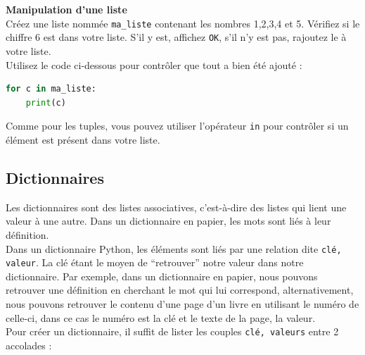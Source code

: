     \begin{Exercice}[5 minutes] \textbf{Manipulation d'une liste}\\
       Créez une liste nommée \lstinline{ma_liste} contenant les nombres 1,2,3,4 et 5. Vérifiez si le chiffre 6 est dans votre liste. S'il y est, affichez \texttt{OK}, s'il n'y est pas, rajoutez le à votre liste. \\
       
       Utilisez le code ci-dessous pour contrôler que tout a bien été ajouté : \\
       
       \begin{lstlisting}[language=Python]
for c in ma_liste:
    print(c)   \end{lstlisting}
    
        \begin{conseil}
            Comme pour les tuples, vous pouvez utiliser l'opérateur \lstinline{in} pour contrôler si un élément est présent dans votre liste.
        \end{conseil}
        
        \begin{solution}
            
        \end{solution}
    \end{Exercice}

	\subsection{Dictionnaires}
	Les dictionnaires sont des listes associatives, c’est-à-dire des listes qui lient une valeur à une autre. Dans un dictionnaire en papier, les mots sont liés à leur définition. \\
	
	Dans un dictionnaire Python, les éléments sont liés par une relation dite \lstinline{clé, valeur}. La clé étant le moyen de “retrouver” notre valeur dans notre dictionnaire. Par exemple, dans un dictionnaire en papier, nous pouvons retrouver une définition en cherchant le mot qui lui correspond, alternativement, nous pouvons retrouver le contenu d’une page d’un livre en utilisant le numéro de celle-ci, dans ce cas le numéro est la clé et le texte de la page, la valeur. \\
	
	Pour créer un dictionnaire, il suffit de lister les couples \lstinline{clé, valeurs} entre 2 accolades : \\
	

